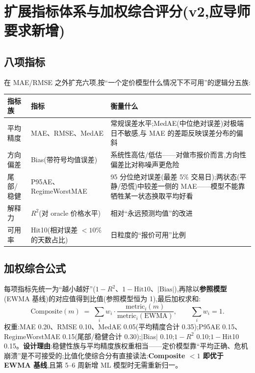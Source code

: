 \documentclass[11pt]{ctexart}
\begin{document}
\section{扩展指标体系与加权综合评分(v2,应导师要求新增)}

\subsection{八项指标}
在 MAE/RMSE 之外扩充六项,按``一个定价模型什么情况下不可用''的逻辑分五族:

\begin{center}
\small
\begin{tabular}{llp{7.2cm}}
\toprule
\textbf{指标族} & \textbf{指标} & \textbf{衡量什么} \\
\midrule
平均精度 & MAE、RMSE、MedAE & 常规误差水平;MedAE(中位绝对误差)对极端日不敏感,与 MAE 的差距反映误差分布的偏斜 \\
方向偏差 & Bias(带符号均值误差) & 系统性高估/低估——对做市报价而言,方向性偏差比对称噪声更危险 \\
尾部/稳健 & P95AE、RegimeWorstMAE & 95 分位绝对误差(最差 5\% 交易日);两状态(平静/恐慌)中较差一侧的 MAE——模型不能靠牺牲某一状态换取平均好看 \\
解释力 & $R^2$(对 oracle 价格水平) & 相对``永远预测均值''的改进 \\
可用率 & Hit10(相对误差 $<10\%$ 的天数占比) & 日粒度的``报价可用''比例 \\
\bottomrule
\end{tabular}
\end{center}

\subsection{加权综合公式}
每项指标先统一为``越小越好''($1-R^2$、$1-\text{Hit10}$、$|\text{Bias}|$),再除以\textbf{参照模型}(EWMA 基线)的对应值得到比值(参照模型恒为 1),最后加权求和:
\[
\text{Composite}(m) \;=\; \sum_i w_i \cdot \frac{\text{metric}_i(m)}{\text{metric}_i(\text{EWMA})},
\qquad \sum_i w_i = 1 .
\]
权重:MAE 0.20、RMSE 0.10、MedAE 0.05(平均精度合计 0.35);P95AE 0.15、RegimeWorstMAE 0.15(尾部/稳健合计 0.30);$|$Bias$|$ 0.10;$1-R^2$ 0.10;$1-$Hit10 0.15。\textbf{设计理由}:稳健性族与平均精度族权重相当——定价模型靠``平均正确、危机崩溃''是不可接受的;比值化使综合分有直接读法:\textbf{Composite $<1$ 即优于 EWMA 基线},且第 5--6 周新增 ML 模型时无需重新归一。
\end{document}
